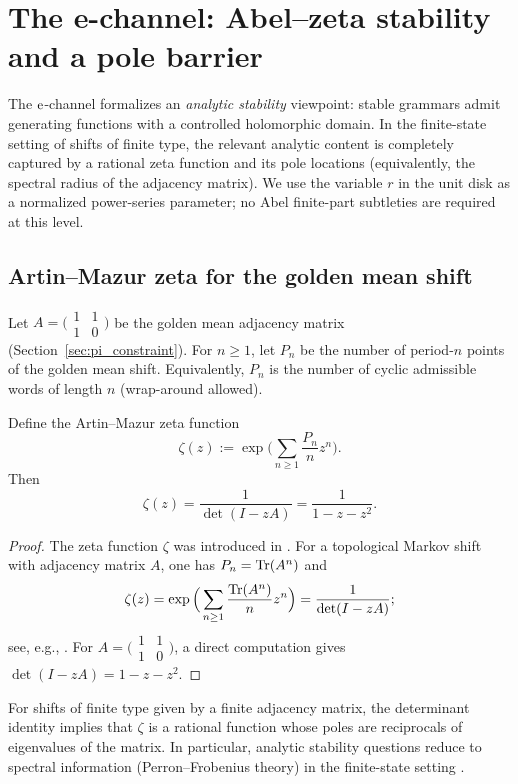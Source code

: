 
\section{The e-channel: Abel--zeta stability and a pole barrier}
\label{sec:e_constraint}

The $\mathrm{e}$-channel formalizes an \emph{analytic stability} viewpoint: stable grammars admit generating functions with a controlled holomorphic domain.
In the finite-state setting of shifts of finite type, the relevant analytic content is completely captured by a rational zeta function and its pole locations (equivalently, the spectral radius of the adjacency matrix).
We use the variable $r$ in the unit disk as a normalized power-series parameter; no Abel finite-part subtleties are required at this level.

\subsection{Artin--Mazur zeta for the golden mean shift}
Let $A=\bigl(\begin{smallmatrix}1&1\\ 1&0\end{smallmatrix}\bigr)$ be the golden mean adjacency matrix (Section~\ref{sec:pi_constraint}).
For $n\ge 1$, let $P_n$ be the number of period-$n$ points of the golden mean shift.
Equivalently, $P_n$ is the number of cyclic admissible words of length $n$ (wrap-around allowed).

\begin{proposition}
\label{prop:zeta_det}
Define the Artin--Mazur zeta function
\[
\zeta(z):=\exp\Big(\sum_{n\ge 1}\frac{P_n}{n}z^n\Big).
\]
Then
\[
\zeta(z)=\frac{1}{\det(I-zA)}=\frac{1}{1-z-z^2}.
\]
\end{proposition}

\begin{proof}
The zeta function $\zeta$ was introduced in \cite{ArtinMazur1965}.
For a topological Markov shift with adjacency matrix $A$, one has $P_n=\mathrm{Tr}(A^n)$ and
\[
\zeta(z)=\exp\Big(\sum_{n\ge 1}\frac{\mathrm{Tr}(A^n)}{n}z^n\Big)=\frac{1}{\det(I-zA)};
\]
see, e.g., \cite{LindMarcus1995,ParryPollicott1990}.
For $A=\bigl(\begin{smallmatrix}1&1\\ 1&0\end{smallmatrix}\bigr)$, a direct computation gives $\det(I-zA)=1-z-z^2$.
\end{proof}

\begin{remark}
For shifts of finite type given by a finite adjacency matrix, the determinant identity implies that $\zeta$ is a rational function whose poles are reciprocals of eigenvalues of the matrix.
In particular, analytic stability questions reduce to spectral information (Perron--Frobenius theory) in the finite-state setting \cite{LindMarcus1995,ParryPollicott1990}.
\end{remark}

